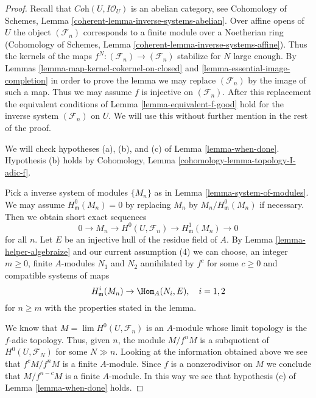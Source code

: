 \begin{proof}
Recall that $\textit{Coh}(U, I\mathcal{O}_U)$ is an abelian category, see
Cohomology of Schemes, Lemma \ref{coherent-lemma-inverse-systems-abelian}.
Over affine opens of $U$ the object $(\mathcal{F}_n)$
corresponds to a finite module over a Noetherian ring
(Cohomology of Schemes, Lemma \ref{coherent-lemma-inverse-systems-affine}).
Thus the kernels of the maps $f^N : (\mathcal{F}_n) \to (\mathcal{F}_n)$
stabilize for $N$ large enough. By
Lemmas \ref{lemma-map-kernel-cokernel-on-closed} and
\ref{lemma-essential-image-completion}
in order to prove the lemma
we may replace $(\mathcal{F}_n)$ by the image of such a map.
Thus we may assume $f$ is injective on $(\mathcal{F}_n)$.
After this replacement the equivalent conditions of
Lemma \ref{lemma-equivalent-f-good} hold for the inverse system
$(\mathcal{F}_n)$ on $U$. We will use this without further mention
in the rest of the proof.

\medskip\noindent
We will check hypotheses (a), (b), and (c) of
Lemma \ref{lemma-when-done}. Hypothesis (b) holds by
Cohomology, Lemma \ref{cohomology-lemma-topology-I-adic-f}.

\medskip\noindent
Pick a inverse system of modules $\{M_n\}$ as in
Lemma \ref{lemma-system-of-modules}.
We may assume $H^0_\mathfrak m(M_n) = 0$ by replacing $M_n$ by
$M_n/H^0_\mathfrak m(M_n)$ if necessary. Then we obtain short exact
sequences
$$
0 \to M_n \to H^0(U, \mathcal{F}_n) \to H^1_\mathfrak m(M_n) \to 0
$$
for all $n$. Let $E$ be an injective hull of the residue field of $A$.
By Lemma \ref{lemma-helper-algebraize} and our current assumption (4)
we can choose, an integer $m \geq 0$, finite $A$-modules
$N_1$ and $N_2$ annihilated by $f^c$ for some $c \geq 0$ and
compatible systems of maps
$$
H^i_\mathfrak m(M_n) \to \Hom_A(N_i, E), \quad i = 1, 2
$$
for $n \geq m$
with the properties stated in the lemma.

\medskip\noindent
We know that $M = \lim H^0(U, \mathcal{F}_n)$ is an $A$-module whose
limit topology is the $f$-adic topology. Thus, given $n$, the module
$M/f^nM$ is a subquotient of $H^0(U, \mathcal{F}_N)$ for some $N \gg n$.
Looking at the information obtained above we see that
$f^cM/f^nM$ is a finite $A$-module. Since $f$ is a nonzerodivisor
on $M$ we conclude that $M/f^{n - c}M$ is a finite $A$-module.
In this way we see that hypothesis (c) of Lemma \ref{lemma-when-done} holds.


\end{proof}
